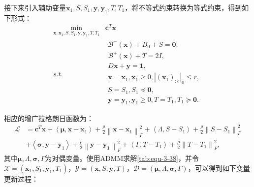 接下来引入辅助变量$\mathbf{x}_1,S,S_1,\mathbf{y},\mathbf{y}_1,T,T_1$，将不等式约束转换为等式约束，得到如下形式：
\begin{equation}
    \label{tab:equ-3-38}
    \begin{matrix}
        \underset{\mathbf{x},\mathbf{x}_1,S,S_1,\mathbf{y},\mathbf{y}_1,T,T_1}{\min}&		\boldsymbol{c}^T\mathbf{x}\\
        s.t.&		\begin{array}{c}
        \mathcal{B} ^-\left( \mathbf{x} \right) +B_0+S=\mathbf{0},\\
        \mathcal{B} ^+\left( \mathbf{x} \right) +T=2I,\\
        D\mathbf{x}+\mathbf{y}=\mathbf{1},\\
        \mathbf{x}=\mathbf{x}_1,\mathbf{x}_1\ge 0,|\left( \mathbf{x}_1 \right) _{:e}|_0\le r,\\
        S=S_1,S_1\preceq \mathbf{0},\\
        \mathbf{y}=\mathbf{y}_1,\mathbf{y}_1\ge 0,T=T_1,T_1\succcurlyeq \mathbf{0}.\\
    \end{array}\\
    \end{matrix}
\end{equation}
相应的增广拉格朗日函数为：
\begin{equation}
    \begin{aligned}
    \label{tab:equ-3-39}
    \mathcal{L} &=\boldsymbol{c}^T\mathbf{x}+\left< \boldsymbol{\mu },\mathbf{x}-\mathbf{x}_1 \right> +\frac{\rho}{2}\left\| \mathbf{x}-\mathbf{x}_1 \right\| _{F}^{2}+\left< \varLambda ,S-S_1 \right> +\frac{\rho}{2}\left\| S-S_1 \right\| _{F}^{2}
    \\
    &+\left< \boldsymbol{\sigma },\mathbf{y}-\mathbf{y}_1 \right> +\frac{\rho}{2}\left\| \mathbf{y}-\mathbf{y}_{\mathbf{1}} \right\| _{F}^{2}+\left< \varGamma ,T-T_1 \right> +\frac{\rho}{2}\left\| T-T_1 \right\| _{F}^{2},
    \end{aligned}
\end{equation}
其中$\boldsymbol{\mu },\varLambda ,\boldsymbol{\sigma },\varGamma$为对偶变量。使用ADMM求解\autoref{tab:equ-3-38}，并令$\mathcal{X} =\left( \mathbf{x}_1,S_1,\mathbf{y}_1,T_1 \right) $，$\mathcal{Y} =\left( \mathbf{x},S,\mathbf{y},T \right) $，$\mathcal{D} =\left( \boldsymbol{\mu },\varLambda ,\boldsymbol{\sigma },\varGamma \right) $，可以得到如下变量更新过程：

